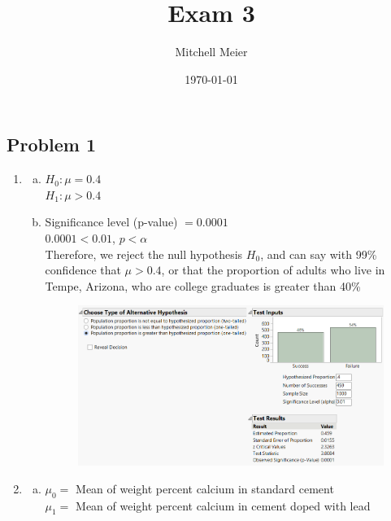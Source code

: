 \documentclass[14pt]{article}
\title{Exam 3}
\author{Mitchell Meier}
\date{\today}
\begin{document}
\maketitle

\subsection*{Problem 1}

\begin{enumerate}

\item
\begin{enumerate}[(a)]
\item
$H_0: \mu = 0.4$ \\
$H_1: \mu > 0.4$ 

\item

Significance level (p-value) $= 0.0001$ \\

$0.0001 < 0.01$, $p < \alpha$ \\

Therefore, we reject the null hypothesis $H_0$, and can say with 99\% confidence that $\mu > 0.4$, or that the proportion of adults who live in Tempe, Arizona, who are college graduates is greater than 40\%

\begin{figure}[h]
\includegraphics[scale=0.75]{exam3Pics/1-1-b.PNG}
\centering
\end{figure}

\end{enumerate}

\pagebreak

\item
\begin{enumerate}[(a)]
\item
$\mu_0 =$ Mean of weight percent calcium in standard cement \\
$\mu_1 =$ Mean of weight percent calcium in cement doped with lead \\


\end{enumerate}
\end{enumerate}
\end{document}
